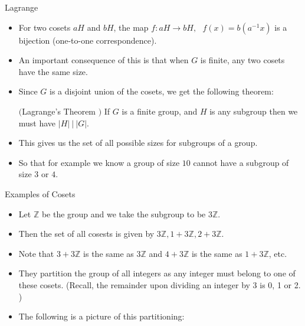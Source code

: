 \documentclass[ %
 10pt, xcolor={dvipsnames,svgnames,x11names,hyperref},
   hyperref={colorlinks=true,citecolor=green,linkcolor=DarkRed,urlcolor=ProcessBlue,anchorcolor=blue}
  ]{beamer}
\newenvironment{stepitemize}{\begin{itemize}[<+->]}{\end{itemize} }
\newcommand{\Z}{\mathbb{Z}}
\begin{document}
\begin{frame}{Lagrange}
\begin{stepitemize}
    \item For two cosets $aH$ and $bH$, the map 
    $f:aH\rightarrow bH, \:\:\: f(x) = b(a^{-1}x)$
is a bijection (one-to-one correspondence).  

    \item An important consequence of this is that when $G$ is finite, any two cosets have the same size. 
    \item Since $G$ is a disjoint union of the cosets, we get the following theorem:
\begin{theorem}$($Lagrange's Theorem $)$
If $G$ is a finite group, and $H$ is any subgroup then we must have $|H| \: | \: |G|$. 
\end{theorem}
\item This gives us the set of all possible sizes for subgroups of a group. 
\item So that for example we know a group of size $10$ cannot have a subgroup of size $3$ or $4$.
\end{stepitemize}
    
\end{frame}

\begin{frame}{Examples of Cosets}
    \begin{stepitemize}
        \item Let $\Z$ be the group and we take the subgroup to be $3\Z$. 
        \item Then the set of all cosests is given by 
    $3\Z, 1+3\Z, 2+3\Z$. 
    \item Note that $3+3\Z$ is the same as $3\Z$ and $4+3\Z$ is the same as $1+3\Z$, etc. 
    \item They partition the group of all integers as any integer must belong to one of these cosets. (Recall, the remainder upon dividing an integer by 3 is 0, 1 or 2. )
    \item The following is a picture of this partitioning:
    
    \bigskip
    

    \end{stepitemize}
\end{frame}
\end{document}
